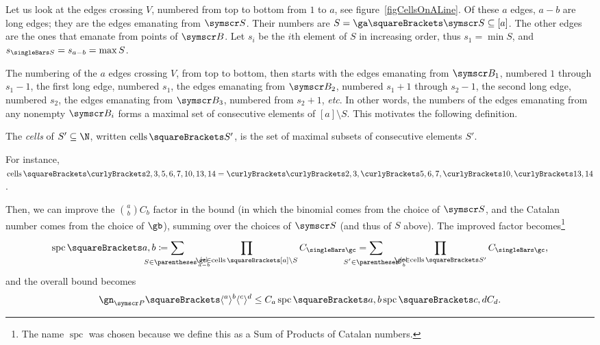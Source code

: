 \documentclass[10pt, a4paper, twoside]{basestyle}
\newcommand{\etc}{\emph{etc}}
\DeclareMathOperator{\cells}{cells}
\DeclareMathOperator{\spc}{spc}
\newcommand{\pointset}{\symscr}
\begin{document}
Let us look at the edges crossing $V$, numbered from top to bottom from $1$ to $a$, see
figure~\ref{figCellsOnALine}. Of these $a$ edges,
$a-b$ are long edges; they are the edges emanating from $\pointset S$. 
Their numbers are $S = \ga\of{\pointset S} \Subset [a]$.
The other edges are the ones that emanate from points of $\pointset B$.
Let $s_i$ be the $i$th element of $S$ in increasing order, thus $s_1=\min S$, and
$s_{\Cardinality S} = s_{a-b} = \max S$.

The numbering of the $a$ edges crossing $V$, from top to bottom, then starts with
the edges emanating from $\pointset B_1$, numbered $1$ through
$s_1-1$, the first long edge, numbered $s_1$, the edges emanating from
$\pointset B_2$, numbered $s_1+1$ through $s_2-1$, the second long edge,
numbered $s_2$, the edges emanating from $\pointset B_3$, numbered from $s_2+1$, \etc.
In other words, the numbers of the edges emanating from any nonempty $\pointset B_i$ forms
a maximal set of consecutive elements of $[a]\setminus S$. This motivates the following
definition.

\begin{definition}
The \emph{cells} of $S'\Subset \N$, written $\cells\of{S'}$, is the set of maximal subsets of
consecutive elements $S'$.
\end{definition}
For instance, $\cells\of{\set{2,3,5,6,7,10,13,14}}=\set{\set{2,3},\set{5,6,7},\set{10},\set{13,14}}$.

Then, we can improve the $\binom a b C_b$ factor in the bound (in which the binomial comes from
the choice of $\pointset S$, and the Catalan number comes
from the choice of $\gb$), summing over the choices of $\pointset S$ (and thus of $S$ above).
The improved factor becomes\footnote{The name $\spc$ was chosen because we define this as
a Sum of Products of Catalan numbers.}\begin{equation}
\spc\of{a,b}\DefineAs
\sum{S\in\binom{[a]}{a-b}} \quad \prod{\gc\in\cells\of{[a] \setminus S}}C_{\Cardinality \gc} =
\sum{S'\in\binom{[a]}{b}} \quad \prod{\gc\in\cells\of{S'}}C_{\Cardinality \gc}\text,
\label{spcDefinition}
\end{equation}
and the overall bound becomes\begin{equation}
\gn_{\pointset P}\of{\langle^a\rangle^b\langle^c\rangle^d}\leq
C_a\spc\of{a, b}\spc\of{c, d}C_d\text.\label{bound-ck-spckl-spcpq-cp}
\end{equation}
\end{document}
